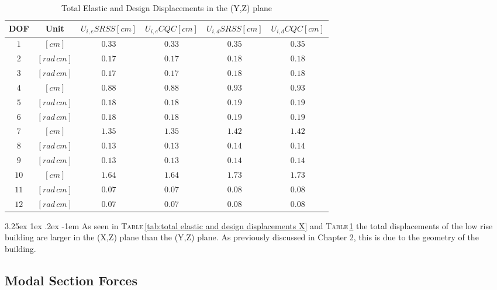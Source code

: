 \documentclass[11pt,a4paper,titlepage]{report}
\makeatletter
\renewcommand\paragraph{\@startsection{paragraph}{5}{\z@}%
  {3.25ex \@plus1ex \@minus.2ex}%
  {-1em}%
  {\normalfont\normalsize\bfseries}}
\makeatother
\begin{document}
\begin{table}[h]
    \centering
       \begin{tabular}{c|c|c|c|c|c}
         DOF & Unit & $U_{i,e} SRSS [cm]$ & $U_{i,e} CQC [cm]$ & $U_{i,d} SRSS [cm]$ & $U_{i,d} CQC [cm]$\\
         \hline
        $1$ & $[cm]$ &$ 0.33$ & $ 0.33$ & $0.35$ & $0.35$ \\
        $2$ & $[rad\,cm]$ & $0.17$ & $0.17$ & $0.18$ & $0.18$ \\
        $3$ & $[rad\,cm]$ & $0.17$ & $0.17$ & $0.18$ & $0.18$ \\
        $4$ & $[cm]$ &$0.88$ & $0.88$ & $0.93$ & $0.93$ \\
        $5$ & $[rad\,cm]$ & $0.18$ & $0.18$ & $0.19$ & $0.19$ \\
        $6$ & $[rad\,cm]$ & $0.18$ & $0.18$ & $0.19$ & $0.19$ \\
        $7$ & $[cm]$ &$1.35$ & $1.35$ & $1.42$ & $1.42$ \\
        $8$ & $[rad\,cm]$ & $0.13$ & $0.13$ & $0.14$ & $0.14$ \\
        $9$ & $[rad\,cm]$ & $0.13$ & $0.13$ & $0.14$ & $0.14$ \\
        $10$ & $[cm]$ & $1.64$ & $1.64$ & $1.73$ & $1.73$ \\
        $11$ & $[rad\,cm]$ & $0.07$ & $0.07$ & $0.08$ & $0.08$ \\
        $12$ & $[rad\,cm]$ & $0.07$ & $0.07$ & $0.08$ & $0.08$ \\
    \end{tabular}
    \caption{Total Elastic and Design Displacements in the (Y,Z) plane}
    \label{tab:total elastic and design displacements Y}
\end{table}
\paragraph{} As seen in \textsc{Table}\,\ref{tab:total elastic and design displacements X} and \textsc{Table}\,\ref{tab:total elastic and design displacements Y} the total displacements of the low rise building are larger in the (X,Z) plane than the (Y,Z) plane. As previously discussed in Chapter 2, this is due to the geometry of the building. 
\subsection{Modal Section Forces}\label{sec: Low Rise - Modal Section Forces}
\end{document}
